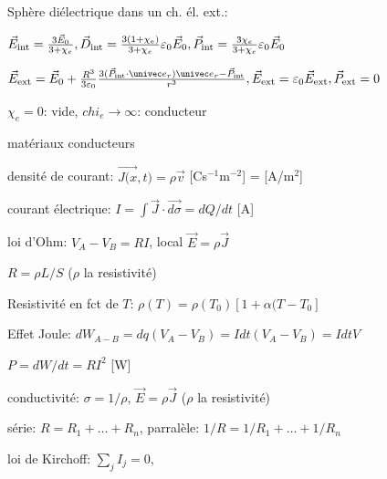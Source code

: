    \item Sphère diélectrique dans un ch. él. ext.:
    \squishlist
     \item $\vec E_{\textrm{int}} = \frac{3 \vec E_0}{3 + \chi_e},
            \vec D_{\textrm{int}} = \frac{3 (1 + \chi_e)}{3 + \chi_e} \varepsilon_0 \vec E_0, \\
            \vec P_{\textrm{int}} = \frac{3 \chi_e}{3 + \chi_e} \varepsilon_0 \vec E_0$
     \item $\vec E_{\textrm{ext}} = \vec E_0 + \frac{R^3}{3 \varepsilon_0}
              \frac{3 ( \vec P_{\textrm{int}} \cdot \univec e_r) \univec e_r - \vec P_{\textrm{int}}}{r^3}, \\
            \vec E_{\textrm{ext}} = \varepsilon_0 \vec E_{\textrm{ext}}, \vec P_{\textrm{ext}} = 0$
     \item $\chi_e = 0$: vide, $chi_e \rightarrow \infty$: conducteur
    \squishend
   \squishend

matériaux conducteurs
	\squishlist
		\item densité de courant: $\vec{J(x},t) = \rho \vec{v}$ [Cs$^{-1}$m$^{-2}$] = [A/m$^2$]
		\item courant électrique: $I=\int\vec{J}\cdot \vec{d\sigma} = dQ/dt$ [A]
		\item loi d'Ohm: $V_A-V_B = RI$, local $\vec{E}=\rho \vec{J}$
		\item $R=\rho L/S$ ($\rho$ la resistivité)
		\item Resistivité en fct de $T$: $\rho(T)=\rho(T_0)[1+\alpha(T-T_0]$
		\item Effet Joule: $dW_{A-B}=dq(V_A-V_B) = Idt(V_A-V_B)=IdtV$
		\item $P=dW/dt = RI^2$ [W]
		\item conductivité: $\sigma = 1/\rho$, $\vec{E} = \rho \vec{J}$ ($\rho$ la resistivité)
		\item série: $R=R_1 + \dots +R_n$, parralèle: $1/R= 1/R_1+\dots+1/R_n$
		\item loi de Kirchoff: $\sum_j I_j=0$,
	\squishend